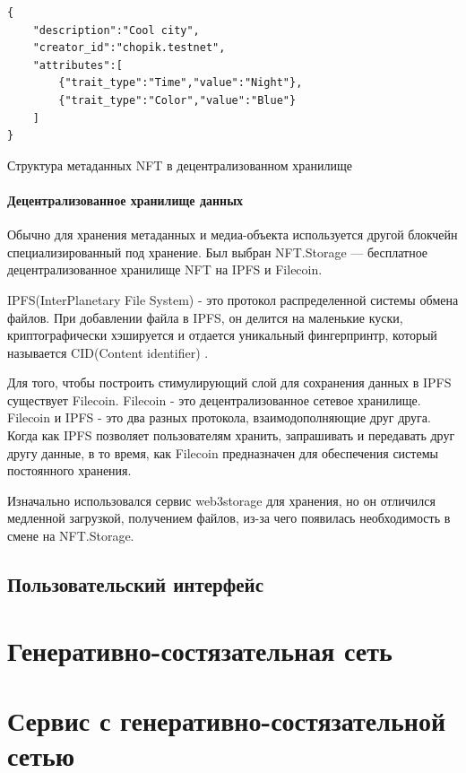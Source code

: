 \begin{listing}
\begin{verbatim}
{
    "description":"Cool city",
    "creator_id":"chopik.testnet",
    "attributes":[
        {"trait_type":"Time","value":"Night"},
        {"trait_type":"Color","value":"Blue"}
    ]
}
\end{verbatim}
\caption{Структура метаданных NFT в децентрализованном хранилище}
\label{lst.nftmetadata}
\end{listing}

\paragraph{Децентрализованное хранилище данных}
\label{section.5.1.5}

Обычно для хранения метаданных и медиа-объекта используется другой блокчейн специализированный под хранение. Был выбран NFT.Storage\cite{nftstorage} --- бесплатное децентрализованное хранилище NFT на IPFS и Filecoin.

\begin{definition}
    IPFS(InterPlanetary File System) - это протокол распределенной системы обмена файлов. При добавлении файла в IPFS, он делится на маленькие куски, криптографически хэшируется и отдается уникальный фингерпринтр, который называется CID(Content identifier) \cite{ipfs}.
\end{definition}

\begin{remark}
    Для того, чтобы построить стимулирующий слой для сохранения данных в IPFS существует Filecoin. Filecoin - это децентрализованное сетевое хранилище. Filecoin и IPFS - это два разных протокола, взаимодополняющие друг друга. Когда как IPFS позволяет пользователям хранить, запрашивать и передавать друг другу данные, в то время, как Filecoin предназначен для обеспечения системы постоянного хранения.
\end{remark}

\begin{remark}
    Изначально использовался сервис web3storage\cite{web3storage} для хранения, но он отличился медленной загрузкой, получением файлов, из-за чего появилась необходимость в смене на NFT.Storage.
\end{remark}

\subsection{Пользовательский интерфейс}

\section{Генеративно-состязательная сеть}
\label{section.6}
\section{Сервис с генеративно-состязательной сетью}
\label{section.7}
